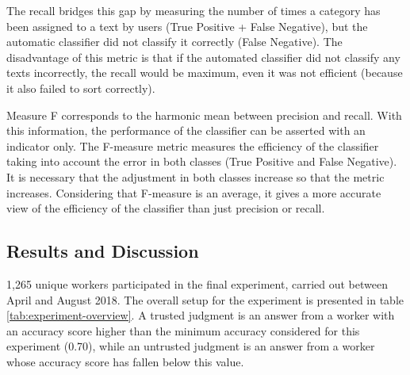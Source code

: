 The recall bridges this gap by measuring the number of times a category has been assigned to a text by users (True Positive + False Negative), but the automatic classifier did not classify it correctly (False Negative). The disadvantage of this metric is that if the automated classifier did not classify any texts incorrectly, the recall would be maximum, even it was not efficient (because it also failed to sort correctly).

Measure F corresponds to the harmonic mean between precision and recall. With this information, the performance of the classifier can be asserted with an indicator only. The F-measure metric measures the efficiency of the classifier taking into account the error in both classes (True Positive and False Negative). It is necessary that the adjustment in both classes increase so that the metric increases. Considering that F-measure is an average, it gives a more accurate view of the efficiency of the classifier than just precision or recall.

\subsection{\hspace*{3pt} Results and Discussion}

1,265 unique workers participated in the final experiment, carried out between April and August 2018. The overall setup for the experiment is presented in table \ref{tab:experiment-overview}. A trusted judgment is an answer from a worker with an accuracy score higher than the minimum accuracy considered for this experiment (0.70), while an untrusted judgment is an answer from a worker whose accuracy score has fallen below this value.

